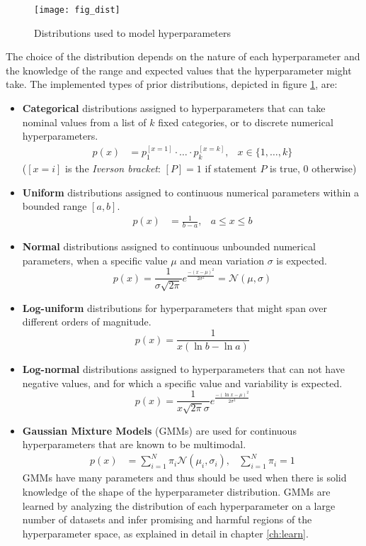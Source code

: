 	\begin{figure}[t]
		\texttt{[image: fig\_dist]}
		\caption{Distributions used to model hyperparameters}
		\label{img:distributions}
	\end{figure}

	The choice of the distribution depends on the nature of each hyperparameter and the knowledge of the
	range and expected values that the hyperparameter might take. The implemented types of prior
	distributions, depicted in figure \ref{img:distributions}, are:
	\begin{itemize}
		\item {\bf Categorical} distributions assigned to hyperparameters that can take nominal values
		from a list of $k$ fixed categories, or to discrete numerical hyperparameters.
		\begin{align}
			p(x) &= p_1^{[x=1]}\cdot \ldots \cdot p_k^{[x=k]}, & x \in \{1,\ldots,k\}
		\end{align}
		($[x=i]$ is the \emph{Iverson bracket}: $[P] = 1$ if statement $P$ is true, $0$ otherwise)
		\item {\bf Uniform} distributions assigned to continuous numerical parameters within a
		bounded range $[a,b]$.
		\begin{align}
			p(x) &= \frac 1 {b - a}, & a \leq x \leq b
		\end{align}
		\item {\bf Normal} distributions assigned to continuous unbounded numerical parameters, when
		a specific value $\mu$ and mean variation $\sigma$ is expected.
		\begin{equation}
			p(x) = \frac 1 {\sigma \sqrt{2\pi}} e^ \frac {-(x - \mu)^2} {2 \sigma^2} =
			\mathcal{N}(\mu, \sigma)
		\end{equation}
		\item {\bf Log-uniform} distributions for hyperparameters that might span over different
		orders of magnitude.
		\begin{equation}
			p(x) = \frac 1 {x(\ln b - \ln a)}
		\end{equation}
		\item {\bf Log-normal} distributions assigned to hyperparameters that can not have negative
		values, and for which a specific value and variability is expected.
		\begin{equation}
			p(x) = \frac 1 {x\sqrt{2\pi}\sigma} e^ \frac{-(\ln x - \mu)^2} {2\sigma^2}
		\end{equation}
		\item {\bf Gaussian Mixture Models} (GMMs) are used for continuous hyperparameters that are
		known to be multimodal.
		\begin{align}
			p(x) &= \sum_{i=1}^N \pi_i \mathcal{N}(\mu_i, \sigma_i),&\sum_{i=1}^N \pi_i = 1
		\end{align}
		GMMs have many parameters and thus should be used when there is solid knowledge of the
		shape of the hyperparameter distribution. GMMs are learned by analyzing the
		distribution of each hyperparameter on a large number of datasets and infer promising and
		harmful regions of the hyperparameter space, as explained in detail in chapter
		\ref{ch:learn}. 
	\end{itemize}

